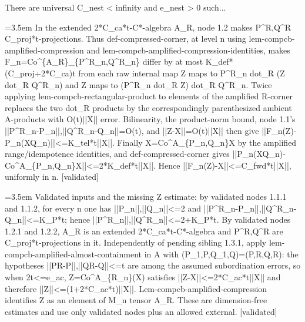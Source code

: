 \documentclass{article}
\newcommand{\step}[1]{\par\noindent\hangindent=3.5em\hangafter=1%
  \makebox[3.5em][l]{\textbf{#1.}}}
\newcommand{\steptag}[1]{\hfill{\small\textsf{[#1]}}}
\begin{document}
\begin{proofbox}{There are universal C\_nest < infinity and e\_nest > 0 such...}
\step{1.3.2} In the extended 2*C\_ca*t-C*-algebra A\_R, node 1.2 makes P\textasciicircum{}R,Q\textasciicircum{}R C\_proj*t-projections. Thus def-compressed-corner, at level n using lem-compcb-amplified-compression and lem-compcb-amplified-compression-identities, makes F\_n=Co\textasciicircum{}\{A\_R\}\_\{P\textasciicircum{}R\_n,Q\textasciicircum{}R\_n\} differ by at most K\_def*(C\_proj+2*C\_ca)t from each raw internal map Z maps to P\textasciicircum{}R\_n dot\_R (Z dot\_R Q\textasciicircum{}R\_n) and Z maps to (P\textasciicircum{}R\_n dot\_R Z) dot\_R Q\textasciicircum{}R\_n. Twice applying lem-compcb-rectangular-product to elements of the amplified R-corner replaces the two dot\_R products by the correspondingly parenthesized ambient A-products with O(t)||X|| error. Bilinearity, the product-norm bound, node 1.1's ||P\textasciicircum{}R\_n-P\_n||,||Q\textasciicircum{}R\_n-Q\_n||=O(t), and ||Z-X||=O(t)||X|| then give ||F\_n(Z)-P\_n(XQ\_n)||<=K\_tel*t||X||. Finally X=Co\textasciicircum{}A\_\{P\_n,Q\_n\}X by the amplified range/idempotence identities, and def-compressed-corner gives ||P\_n(XQ\_n)-Co\textasciicircum{}A\_\{P\_n,Q\_n\}X||<=2*K\_def*t||X||. Hence ||F\_n(Z)-X||<=C\_fwd*t||X||, uniformly in n. \steptag{validated} \\[6pt]
\step{1.3.2.1} Validated inputs and the missing Z estimate: by validated nodes 1.1.1 and 1.1.2, for every n one has ||P\_n||,||Q\_n||<=2 and ||P\textasciicircum{}R\_n-P\_n||,||Q\textasciicircum{}R\_n-Q\_n||<=K\_P*t; hence ||P\textasciicircum{}R\_n||,||Q\textasciicircum{}R\_n||<=2+K\_P*t. By validated nodes 1.2.1 and 1.2.2, A\_R is an extended 2*C\_ca*t-C*-algebra and P\textasciicircum{}R,Q\textasciicircum{}R are C\_proj*t-projections in it. Independently of pending sibling 1.3.1, apply lem-compcb-amplified-almost-containment in A with (P\_1,P,Q\_1,Q)=(P,R,Q,R): the hypotheses ||PR-P||,||QR-Q||<=t are among the assumed subordination errors, so when 2t<=e\_ac, Z=Co\textasciicircum{}A\_\{R\_n\}(X) satisfies ||Z-X||<=2*C\_ac*t||X|| and therefore ||Z||<=(1+2*C\_ac*t)||X||. Lem-compcb-amplified-compression identifies Z as an element of M\_n tensor A\_R. These are dimension-free estimates and use only validated nodes plus an allowed external. \steptag{validated} \\[4pt]

\end{proofbox}
\end{document}
